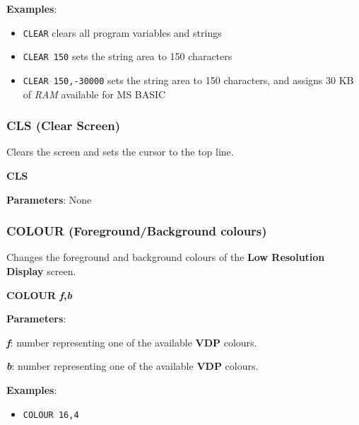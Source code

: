     \textbf{Examples}:
    \begin{itemize}
        \item \texttt{CLEAR} clears all program variables and strings
        \item \texttt{CLEAR 150} sets the string area to 150 characters
        \item \texttt{CLEAR 150,-30000} sets the string area to 150 characters,
        and assigns 30 KB of \textit{RAM} available for MS BASIC
    \end{itemize}

    \subsubsection{{CLS (Clear Screen)}}
    \label{msbasic:lang:cls}
    Clears the screen and sets the cursor to the top line.

    \hspace{1.9cm}\textbf{CLS}

    \textbf{Parameters}: None

    \subsubsection{{COLOUR (Foreground/Background colours)}}
    \label{msbasic:lang:colour}
    Changes the foreground and background colours of the \textbf{Low
    Resolution Display} screen.

    \hspace{1.9cm}\textbf{COLOUR \textit{f},\textit{b}}

    \textbf{Parameters}:

    \hspace{1cm}\textbf{\textit{f}}: number representing one
    of the available \textbf{VDP} colours.

    \hspace{1cm}\textbf{\textit{b}}: number representing one
    of the available \textbf{VDP} colours.

    \textbf{Examples}:
    \begin{itemize}
        \item \texttt{COLOUR 16,4}
    \end{itemize}

